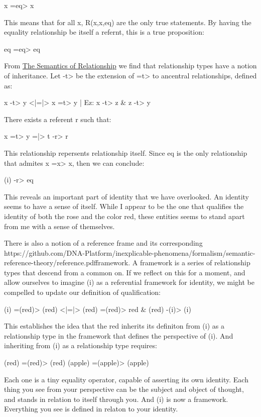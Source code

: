\documentclass[runningheads]{llncs}
\begin{document}
x =eq> x

This means that for all x, R(x,x,eq) are the only true statements. By having the equality relationship be itself a refernt, this is a true proposition:

eq =eq> eq

From \href{https://github.com/DNA-Platform/inexplicable-phenomena/formalism/semantic-reference-theory/relationship.pdf}{The Semantics of Relationship} we find that relationship types have a notion of inheritance. Let -t> be the extension of =t> to ancentral relationships, defined as:

x -t> y <|=|> x =t> y | Ez: x -t> z \& z -t> y

There exists a referent r such that:

x =t> y =|> t -r> r

This relationship repersents relationship itself. Since eq is the only relationship that admites x =x> x, then we can conclude:

(i) -r> eq

This reveals an important part of identity that we have overlooked. An identity seems to have a sense of itself. While I appear to be the one that qualifies the identity of both the rose and the color red, these entities seems to stand apart from me with a sense of themselves. 

There is also a notion of a reference frame and its corresponding {https://github.com/DNA-Platform/inexplicable-phenomena/formalism/semantic-reference-theory/reference.pdf}{framework}. A framework is a series of relationship types that descend from a common on. If we reflect on this for a moment, and allow ourselves to imagine (i) as a referential framework for identity, we might be compelled to update our definition of qualification:

(i) =(red)> (red) <|=|> (red) =(red)> red \& (red) -(i)> (i)

This establishes the idea that the red inherits its definiton from (i) as a relationship type in the framework that defines the perspective of (i). And inheriting from (i) as a relationship type requires:

(red) =(red)> (red)
(apple) =(apple)> (apple)

Each one is a tiny equality operator, capable of asserting its own identity. Each thing you see from your perspective can be the subject and object of thought, and stands in relation to itself through you. And (i) is now a framework. Everything you see is defined in relaton to your identity. 
\end{document}
